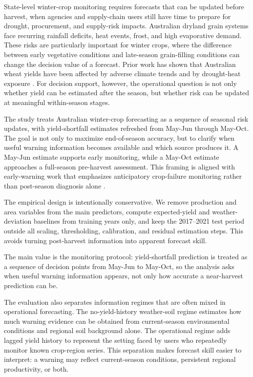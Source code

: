 \documentclass[wcp]{jmlr}
\begin{document}
State-level winter-crop monitoring requires forecasts that can be updated before harvest, when agencies and supply-chain users still have time to prepare for drought, procurement, and supply-risk impacts. Australian dryland grain systems face recurring rainfall deficits, heat events, frost, and high evaporative demand. These risks are particularly important for winter crops, where the difference between early vegetative conditions and late-season grain-filling conditions can change the decision value of a forecast. Prior work has shown that Australian wheat yields have been affected by adverse climate trends and by drought-heat exposure \citep{hochman2017climateTrendsAustralia,feng2019droughtHeatAustralia}. For decision support, however, the operational question is not only whether yield can be estimated after the season, but whether risk can be updated at meaningful within-season stages.

The study treats Australian winter-crop forecasting as a sequence of seasonal risk updates, with yield-shortfall estimates refreshed from May-Jun through May-Oct. The goal is not only to maximize end-of-season accuracy, but to clarify when useful warning information becomes available and which source produces it. A May-Jun estimate supports early monitoring, while a May-Oct estimate approaches a full-season pre-harvest assessment. This framing is aligned with early-warning work that emphasizes anticipatory crop-failure monitoring rather than post-season diagnosis alone \citep{anderson2024preseasonWarning}.

The empirical design is intentionally conservative. We remove production and area variables from the main predictors, compute expected-yield and weather-deviation baselines from training years only, and keep the 2017--2021 test period outside all scaling, thresholding, calibration, and residual estimation steps. This avoids turning post-harvest information into apparent forecast skill.

The main value is the monitoring protocol: yield-shortfall prediction is treated as a sequence of decision points from May-Jun to May-Oct, so the analysis asks when useful warning information appears, not only how accurate a near-harvest prediction can be.

The evaluation also separates information regimes that are often mixed in operational forecasting. The no-yield-history weather-soil regime estimates how much warning evidence can be obtained from current-season environmental conditions and regional soil background alone. The operational regime adds lagged yield history to represent the setting faced by users who repeatedly monitor known crop-region series. This separation makes forecast skill easier to interpret: a warning may reflect current-season conditions, persistent regional productivity, or both.
\end{document}
